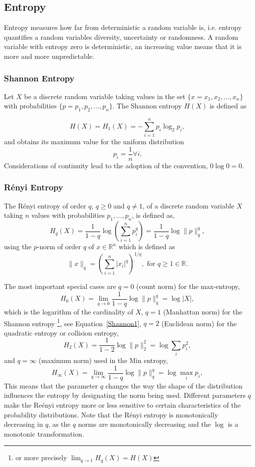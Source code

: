 \documentclass[12pt, twoside]{article}
\newcommand{\R}{\mathbb{R}}
\newcommand{\1}{\mathbb{1}}
\begin{document}
\subsection{Entropy}
Entropy measures how far from deterministic a random variable is, i.e. entropy quantifies a random variables diversity, uncertainty or randomness. 
A random variable with entropy zero is deterministic, an increasing value  means that it is more and more unpredictable.
    
\subsubsection{Shannon Entropy}
Let $ X $ be a discrete random variable taking values in the set $ \{x = x_1, x_2, \ldots, x_n \} $ with probabilities $ \{p = p_1, p_2, \ldots, p_n \} $. The Shannon entropy $ H(X) $ is defined as 

\begin{equation}\label{Shannon1}
    H(X) = H_1(X) = - \sum_{i = 1} ^ n p_i \log_2 p_i,
\end{equation}
and obtains its maximum value for the uniform distribution
$$p_i = \frac{1}{n} \forall i.$$
Considerations of continuity lead to the adoption of the convention, $ 0 \log 0  = 0 $.



\subsubsection{R\'enyi Entropy}
The R\'enyi entropy of order $ q $, $ q  \geq 0 $ and $ q \neq 1 $, of a discrete random variable $ X $ taking $ n $ values with probabilities $ p_1, \ldots, p_n $, is defined as,
\begin{equation}
        H_q(X) = 
        \frac{1}{1 - q} \log \left( \sum_{i=1}^n p_i ^ {q} \right)
        = \frac{1}{1 - q} \log \| p \|_q^q,  
\end{equation}
using the $ p $-norm of order $ q $ of $ x  \in \R ^ n $  which is defined as   
$$ \| x \|_q = \left( \sum_{i=1}^n |x_i|^q \right)^{1/q}, \textrm{ for } q \geq 1 \in \R. $$

The most important special cases are $q = 0$ (count norm) for the max-entropy,
$$ 
H_0(X) = \lim_{q \to 0} \frac{1}{1 - q} \log \| p \|_q^q =  \log |X|,
$$
which is the logarithm of the cardinality of $X$,
$ q = 1 $ (Manhattan norm) for the Shannon entropy \footnote{or more precisely $\lim_{q \to 1} H_q(X) = H(X)$}, see Equation~\eqref{Shannon1},  $ q = 2 $ (Euclidean norm)  for the quadratic entropy or collision entropy, 
$$ 
H_2(X) = \frac{1}{1 - 2} \log \| p \|_2^2 = \log \sum_{i} p_i^2,
$$
and $q = \infty$ (maximum norm) used in the Min entropy,
$$ 
H_\infty(X) = \lim_{q \to \infty} \frac{1}{1 - q} \log \| p \|_q^q = \log \max_{i} p_i,
$$
This means that the parameter $ q $ changes the way the shape of the distribution influences the entropy by designating the norm being used. Different parameters $q$ make the Re\'enyi entropy more or less sensitive to certain characteristics of the probability distributions.
Note that the R\'enyi  entropy is monotonically decreasing in $q$, as the $q$ norms are monotonically decreasing and the $\log$ is a monotonic transformation. 
\end{document}

